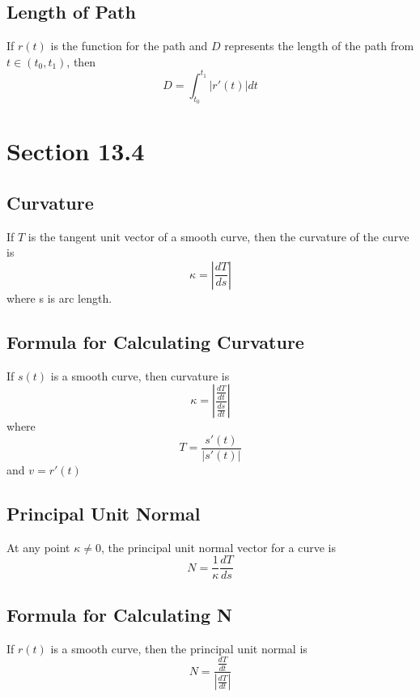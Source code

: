 \documentclass[12pt]{article}
\theoremstyle{break}
\numberwithin{theorem}{subsection}
\numberwithin{lemma}{subsection}
\numberwithin{corollary}{subsection}
\numberwithin{equation}{subsection}
\begin{document}
\subsection{Length of Path}
If $r(t)$ is the function for the path and $D$ represents the length of the path from $t \in (t_0, t_1)$,
then 
\begin{equation*}
	D = \int_{t_0}^{t_1} |r'(t)|dt
\end{equation*}

\section{Section 13.4}

\subsection{Curvature}
If $T$ is the tangent unit vector of a smooth curve, then the curvature of the curve is
\begin{equation*}
\kappa = \left| \frac{dT}{ds} \right|
\end{equation*}
where s is arc length.

\subsection{Formula for Calculating Curvature}
If $s(t)$ is a smooth curve, then curvature is 
\begin{equation*}
\kappa = \left| \frac{\frac{dT}{dt}}{\frac{ds}{dt}} \right|
\end{equation*}
where 
\begin{equation*}
T = \frac{s'(t)}{|s'(t)|}
\end{equation*}
and $v = r'(t)$

\subsection{Principal Unit Normal}
At any point $\kappa \neq 0$, the principal unit normal vector for a curve is 
\begin{equation*}
N = \frac{1}{\kappa} \frac{dT}{ds}
\end{equation*}

\subsection{Formula for Calculating N}
If $r(t)$ is a smooth curve, then the principal unit normal is
\begin{equation*}
N = \frac{\frac{dT}{dt}}{\left| \frac{dT}{dt} \right |}
\end{equation*}
\end{document}
